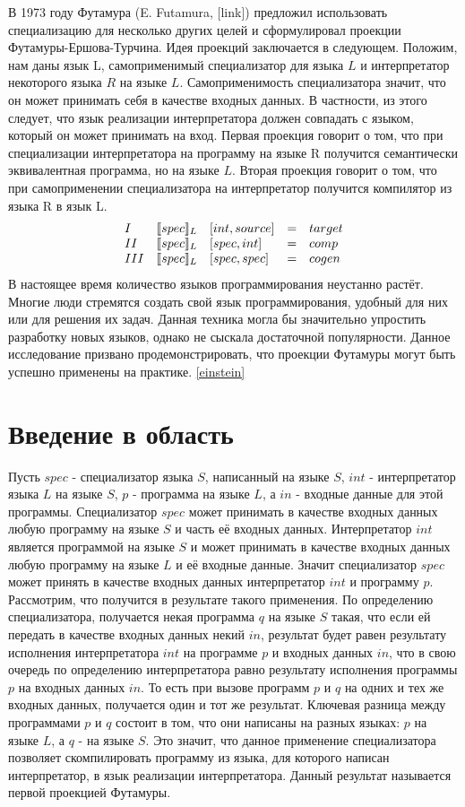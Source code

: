 \documentclass{spbau-diploma}
\begin{document}
В 1973 году Футамура (E. Futamura, [link]) предложил использовать специализацию для несколько других целей и сформулировал проекции Футамуры-Ершова-Турчина. Идея проекций заключается в следующем. Положим, нам даны язык L, самоприменимый специализатор для языка $L$ и интерпретатор некоторого языка $R$ на языке $L$. Самоприменимость специализатора значит, что он может принимать себя в качестве входных данных. В частности, из этого следует, что язык реализации интерпретатора должен совпадать с языком, который он может принимать на вход. Первая проекция говорит о том, что при специализации интерпретатора на программу на языке R получится семантически эквивалентная программа, но на языке $L$. Вторая проекция говорит о том, что при самоприменении специализатора на интерпретатор получится компилятор из языка R в язык L.
    $$
    \begin{array}{l l l c l}
      I & \llbracket spec \rrbracket_L &[int, source] &= &target\\
      II & \llbracket spec \rrbracket_L &[spec, int] &= &comp\\
      III & \llbracket spec \rrbracket_L &[spec, spec] &= &cogen
    \end{array}$$
В настоящее время количество языков программирования неустанно растёт. Многие люди стремятся создать свой язык программирования, удобный для них или для решения их задач. Данная техника могла бы значительно упростить разработку новых языков, однако не сыскала достаточной популярности. Данное исследование призвано продемонстрировать, что проекции Футамуры могут быть успешно применены на практике. \ref{einstein}

\section{ Введение в область}

Пусть $spec$ - специализатор языка $S$, написанный на языке $S$, $int$ - интерпретатор языка $L$ на языке $S$, $p$ - программа на языке $L$, а $in$ - входные данные для этой программы. Специализатор $spec$ может принимать в качестве входных данных любую программу на языке $S$ и часть её входных данных. Интерпретатор $int$ является программой на языке $S$ и может принимать в качестве входных данных любую программу на языке $L$ и её входные данные. Значит специализатор $spec$ может принять в качестве входных данных интерпретатор $int$ и программу $p$. Рассмотрим, что получится в результате такого применения. По определению специализатора, получается некая программа $q$ на языке $S$ такая, что если ей передать в качестве входных данных некий $in$, результат будет равен результату исполнения интерпретатора $int$ на программе $p$ и входных данных $in$, что в свою очередь по определению интерпретатора равно результату исполнения программы $p$ на входных данных $in$. То есть при вызове программ $p$ и $q$ на одних и тех же входных данных, получается один и тот же результат. Ключевая разница между программами $p$ и $q$ состоит в том, что они написаны на разных языках: $p$ на языке $L$, а $q$ - на языке $S$. Это значит, что данное применение специализатора позволяет скомпилировать программу из языка, для которого написан интерпретатор, в язык реализации интерпретатора. Данный результат называется первой проекцией Футамуры.
\end{document}
